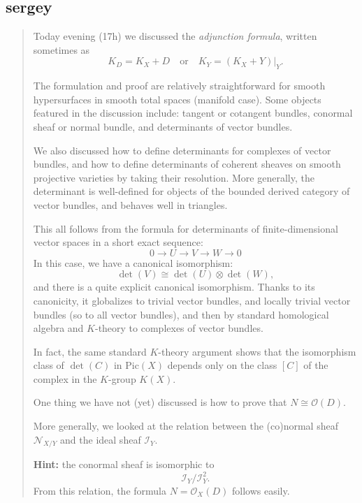 \subsection{sergey}

\begin{quotation}
	Today evening (17h) we discussed the \emph{adjunction formula}, written sometimes as 
\[ K_D = K_X + D \quad \text{or} \quad K_Y = (K_X + Y)|_Y. \]

The formulation and proof are relatively straightforward for smooth hypersurfaces in smooth total spaces (manifold case). Some objects featured in the discussion include: tangent or cotangent bundles, conormal sheaf or normal bundle, and determinants of vector bundles.

We also discussed how to define determinants for complexes of vector bundles, and how to define determinants of coherent sheaves on smooth projective varieties by taking their resolution. More generally, the determinant is well-defined for objects of the bounded derived category of vector bundles, and behaves well in triangles.

This all follows from the formula for determinants of finite-dimensional vector spaces in a short exact sequence:
\[
0 \longrightarrow U \longrightarrow V \longrightarrow W \longrightarrow 0
\]
In this case, we have a canonical isomorphism:
\[
\det(V) \cong \det(U) \otimes \det(W),
\]
and there is a quite explicit canonical isomorphism. Thanks to its canonicity, it globalizes to trivial vector bundles, and locally trivial vector bundles (so to all vector bundles), and then by standard homological algebra and $K$-theory to complexes of vector bundles.

In fact, the same standard $K$-theory argument shows that the isomorphism class of $\det(C)$ in $\mathrm{Pic}(X)$ depends only on the class $[C]$ of the complex in the $K$-group $K(X)$.

\medskip

\noindent One thing we have not (yet) discussed is how to prove that $N \cong \mathcal{O}(D)$.

More generally, we looked at the relation between the (co)normal sheaf $\mathcal{N}_{X/Y}$ and the ideal sheaf $\mathcal{I}_Y$.

\medskip

\noindent \textbf{Hint:} the conormal sheaf is isomorphic to
\[
\mathcal{I}_Y / \mathcal{I}_Y^2.
\]
From this relation, the formula $N = \mathcal{O}_X(D)$ follows easily.
\end{quotation}


